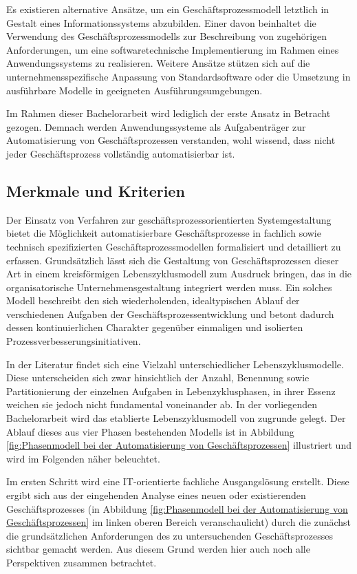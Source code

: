 Es existieren alternative Ansätze, um ein Geschäftsprozessmodell letztlich in Gestalt eines Informationssystems abzubilden. Einer davon beinhaltet die Verwendung des Geschäftsprozessmodells zur Beschreibung von zugehörigen Anforderungen, um eine softwaretechnische Implementierung im Rahmen eines Anwendungssystems zu realisieren. Weitere Ansätze stützen sich auf die unternehmensspezifische Anpassung von Standardsoftware oder die Umsetzung in ausführbare Modelle in geeigneten Ausführungsumgebungen.

\cite{Lehmann.2008} 
Im Rahmen dieser Bachelorarbeit wird lediglich der erste Ansatz in Betracht gezogen. Demnach werden Anwendungssysteme als Aufgabenträger zur Automatisierung von Geschäftsprozessen verstanden, wohl wissend, dass nicht jeder Geschäftsprozess vollständig automatisierbar ist.

\subsection{Merkmale und Kriterien}
Der Einsatz von Verfahren zur geschäftsprozessorientierten Systemgestaltung bietet die Möglichkeit automatisierbare Geschäftsprozesse in fachlich sowie technisch spezifizierten Geschäftsprozessmodellen formalisiert und detailliert zu erfassen.
Grundsätzlich lässt sich die Gestaltung von Geschäftsprozessen dieser Art in einem kreisförmigen Lebenszyklusmodell zum Ausdruck bringen, das in die organisatorische Unternehmensgestaltung integriert werden muss. 
\cite{Scheer.1991}
Ein solches Modell beschreibt den sich wiederholenden, idealtypischen Ablauf der verschiedenen Aufgaben der Geschäftsprozessentwicklung und betont dadurch dessen kontinuierlichen Charakter gegenüber einmaligen und isolierten Prozessverbesserungsinitiativen.
\cite{Leiting.2012}

In der Literatur findet sich eine Vielzahl unterschiedlicher Lebenszyklusmodelle.
\cite{MacedodeMorais.2014} 
Diese unterscheiden sich zwar hinsichtlich der Anzahl, Benennung sowie Partitionierung der einzelnen Aufgaben in Lebenzyklusphasen, in ihrer Essenz weichen sie jedoch nicht fundamental voneinander ab.
\cite{Houy.2010}
In der vorliegenden Bachelorarbeit wird das etablierte Lebenszyklusmodell von \citeauthor{Scheer.1991}
\cite{Scheer.1991} zugrunde gelegt.
Der Ablauf dieses aus vier Phasen bestehenden Modells ist in Abbildung \ref{fig:Phasenmodell bei der Automatisierung von Geschäftsprozessen} illustriert und wird im Folgenden näher beleuchtet.

Im ersten Schritt wird eine \ac{IT}-orientierte fachliche Ausgangslösung erstellt.
Diese ergibt sich aus der eingehenden Analyse eines neuen oder existierenden Geschäftsprozesses (in Abbildung \ref{fig:Phasenmodell bei der Automatisierung von Geschäftsprozessen} im linken oberen Bereich veranschaulicht) durch die zunächst die grundsätzlichen Anforderungen des zu untersuchenden Geschäftsprozesses sichtbar gemacht werden.
\cite{Schwegmann.2002}
Aus diesem Grund werden hier auch noch alle Perspektiven zusammen betrachtet.

